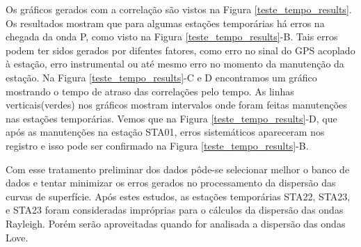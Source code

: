 Os gráficos gerados com a correlação são vistos na Figura \ref{teste_tempo_results}. Os resultados mostram que para algumas estações temporárias há erros na chegada da onda P, como visto na Figura \ref{teste_tempo_results}-B. Tais erros podem ter sidos gerados por difentes fatores, como erro no sinal do GPS acoplado à estação, erro instrumental ou até mesmo erro no momento da manutenção da estação. Na Figura \ref{teste_tempo_results}-C e D encontramos um gráfico mostrando o tempo de atraso das correlações pelo tempo. As linhas verticais(verdes) nos gráficos mostram intervalos onde foram feitas manutenções nas estações temporárias. Vemos que na Figura \ref{teste_tempo_results}-D, que após as manutenções na estação STA01, erros sistemáticos apareceram nos registro e isso pode ser confirmado na Figura \ref{teste_tempo_results}-B.

Com esse tratamento preliminar dos dados pôde-se selecionar melhor o banco de dados e tentar minimizar os erros gerados no processamento da dispersão das curvas de superfície. Após estes estudos, as estações temporárias STA22, STA23, e STA23 foram consideradas impróprias para o cálculos da dispersão das ondas Rayleigh. Porém serão aproveitadas quando for analisada a dispersão das ondas Love. 
